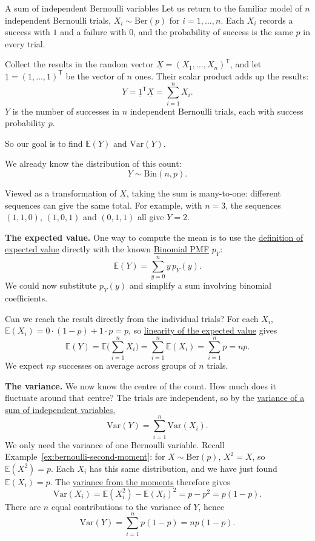 \documentclass[a4paper,12pt,oneside]{report}
\begin{document}
\begin{framedexample}{A sum of independent Bernoulli variables}\label{ex:bernoulli-sum}
Let us return to the familiar model of $n$ independent Bernoulli trials,
$X_i\sim\mathrm{Ber}(p)$ for $i=1,\ldots,n$. Each $X_i$ records a success
with $1$ and a failure with $0$, and the probability of success is the
same $p$ in every trial.

Collect the results in the random vector
$\underline{X}=(X_1,\ldots,X_n)^{\mathsf T}$, and let
$\underline{1}=(1,\ldots,1)^{\mathsf T}$ be the vector of $n$ ones. Their
scalar product adds up the results:
\[
Y=\underline{1}^{\mathsf T}\underline{X}=\sum_{i=1}^nX_i.
\]
$Y$ is the number of successes in $n$ independent Bernoulli trials,
each with success probability $p$.

So our goal is to find $\mathbb{E}(Y)$ and $\mathrm{Var}(Y)$.

We already know the distribution of this count:
\[
Y\sim\hyperref[sec:binomial]{\mathrm{Bin}(n,p)}.
\]

Viewed as a transformation of $\underline{X}$, taking the sum is
many-to-one: different sequences can give the same total. For example,
with $n=3$, the sequences $(1,1,0)$, $(1,0,1)$ and $(0,1,1)$ all give
$Y=2$.

\textbf{The expected value.} One way to compute the mean is to use the
\hyperref[def:expected-value]{definition of expected value} directly
with the known \hyperref[sec:binomial]{Binomial PMF} $p_Y$:
\[
\mathbb{E}(Y)=\sum_{y=0}^n y\,p_Y(y).
\]
We could now substitute $p_Y(y)$ and simplify a sum involving binomial
coefficients.

Can we reach the result directly from the individual
trials? For each $X_i$, $\mathbb{E}(X_i)=0\cdot(1-p)+1\cdot p=p$, so
\hyperref[prop:linear-vector]{linearity of the expected value} gives
\[
\mathbb{E}(Y)=\mathbb{E}\Big(\sum_{i=1}^nX_i\Big)
=\sum_{i=1}^n\mathbb{E}(X_i)
=\sum_{i=1}^n p=np.
\]
We expect $np$ successes on average across groups of $n$ trials.

\textbf{The variance.} We now know the centre of the count. How much
does it fluctuate around that centre? The trials are independent, so by
the \hyperref[cor:var-independent]{variance of a sum of independent variables},
\[
\mathrm{Var}(Y)=\sum_{i=1}^n\mathrm{Var}(X_i).
\]
We only need the variance of one Bernoulli variable. Recall
Example~\ref{ex:bernoulli-second-moment}: for $X\sim\mathrm{Ber}(p)$,
$X^2=X$, so $\mathbb{E}(X^2)=p$. Each $X_i$ has this same distribution,
and we have just found $\mathbb{E}(X_i)=p$. The
\hyperref[prop:var-moments]{variance from the moments} therefore gives
\[
\mathrm{Var}(X_i)=\mathbb{E}(X_i^2)-\mathbb{E}(X_i)^2
=p-p^2=p(1-p).
\]
There are $n$ equal contributions to the variance of $Y$, hence
\[
\mathrm{Var}(Y)=\sum_{i=1}^n p(1-p)=np(1-p).
\]


\end{framedexample}
\end{document}

